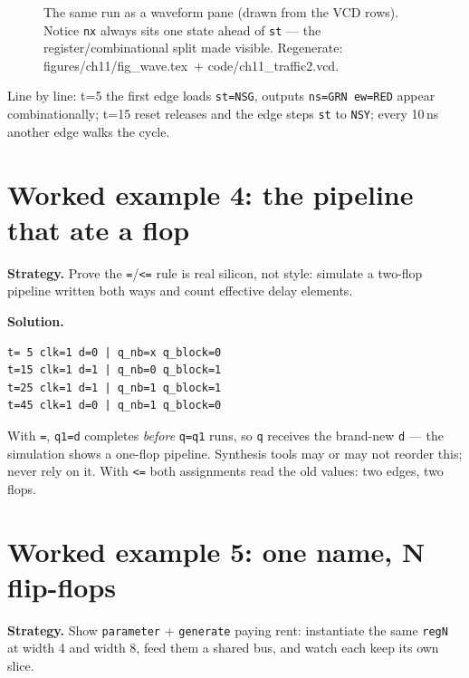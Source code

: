 \begin{figure}[htbp]
\centering

\caption{The same run as a waveform pane (drawn from the VCD rows).
Notice \texttt{nx} always sits one state ahead of \texttt{st} --- the
register/combinational split made visible. Regenerate:
\ttfamily figures/ch11/fig\_wave.tex\ + code/ch11\_traffic2.vcd.}
\label{fig:wave}
\end{figure}

Line by line: t=5 the first edge loads \texttt{st=NSG}, outputs
\texttt{ns=GRN ew=RED} appear combinationally; t=15 reset releases and
the edge steps \texttt{st} to \texttt{NSY}; every 10\,ns another edge
walks the cycle.

\section{Worked example 4: the pipeline that ate a flop}
\label{sec:we-pipe}

\textbf{Strategy.} Prove the \texttt{=}/\texttt{<=} rule is real
silicon, not style: simulate a two-flop pipeline written both ways and
count effective delay elements.

\textbf{Solution.}
\begin{lstlisting}[caption={Real run of \ttfamily ch11\_pipe\_tb.v.
Notice t=15: \texttt{q\_block} is already 1 while the nonblocking
\texttt{q\_nb} still holds 0 --- blocking leaked \texttt{d} through two
``flops'' in one edge. The nonblocking output arrives at t=25, a full
edge later, as real hardware would.},abovecaptionskip=0pt]
t= 5 clk=1 d=0 | q_nb=x q_block=0
t=15 clk=1 d=1 | q_nb=0 q_block=1
t=25 clk=1 d=1 | q_nb=1 q_block=1
t=45 clk=1 d=0 | q_nb=1 q_block=0
\end{lstlisting}

With \texttt{=}, \texttt{q1=d} completes \emph{before} \texttt{q=q1}
runs, so \texttt{q} receives the brand-new \texttt{d} --- the
simulation shows a one-flop pipeline. Synthesis tools may or may not
reorder this; never rely on it. With \texttt{<=} both assignments read
the old values: two edges, two flops.

\section{Worked example 5: one name, N flip-flops}
\label{sec:we-gen}

\textbf{Strategy.} Show \texttt{parameter} + \texttt{generate} paying
rent: instantiate the same \texttt{regN} at width 4 and width 8, feed
them a shared bus, and watch each keep its own slice.

